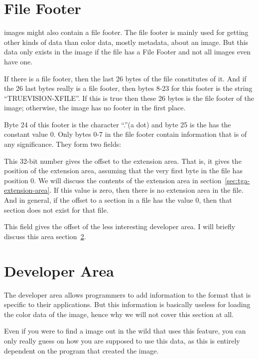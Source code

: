 \section{File Footer}

\tga images might also contain a file footer. The file footer is mainly
used for getting other kinds of data than color data, mostly metadata,
about an image. But this data only exists in the image if the file has
a File Footer and not all \tga images even have one.

If there is a file footer, then the last 26 bytes of the file
constitutes of it. And if the 26 last bytes really is a file footer,
then bytes 8-23 for this footer is the \ascii string
``TRUEVISION-XFILE''. If this is true then these 26 bytes is the file
footer of the image; otherwise, the image has no footer in the first
place.

Byte 24 of this footer is the \ascii character ``.''(a dot) and byte
25 is the has the constant value $0$. Only bytes 0-7 in the file
footer contain information that is of any significance. They form two
fields:


This 32-bit number gives the offset to the extension area. That is, it
gives the position of the extension area, assuming that the very first
byte in the file has position 0. We will discuss the contents of the
extension area in section~\ref{sec:tga-extension-area}. If this value
is zero, then there is no extension area in the file. And in general,
if the offset to a section in a file has the value $0$, then that
section does not exist for that file.


This field gives the offset of the less interesting developer area. I
will briefly discuss this area section~\ref{sec:developer-area}.

\section{Developer Area}
\label{sec:developer-area}

The developer area allows programmers to add information to the \tga
format that is specific to their applications. But this information is
basically useless for loading the color data of the \tga image, hence
why we will not cover this section at all.

Even if you were to find a \tga image out in the wild that uses this
feature, you can only really guess on how you are supposed to use this
data, as this is entirely dependent on the program that created the
image.

